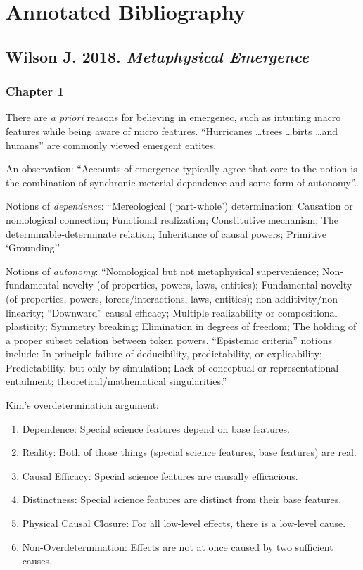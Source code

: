 \documentclass{article}
\newcommand{\ti}[1]{\textit{#1}}
\newcommand{\annbibtitle}[2]{\subsection*{#1. \ti{#2}}}
\begin{document}
\newpage
\section*{\centering Annotated Bibliography}
\bigskip \bigskip

\annbibtitle{Wilson J. 2018}{Metaphysical Emergence}
\subsubsection*{Chapter 1}

There are \ti{a priori} reasons for believing in emergenec, such as intuiting macro features while being aware of micro features. ``Hurricanes \dots trees \dots birts \dots and humans'' are commonly viewed emergent entites.

An observation: ``Accounts of emergence typically agree that core to the notion is the combination of synchronic meterial dependence and some form of autonomy''.

Notions of \ti{dependence}: ``Mereological (‘part-whole’) determination; Causation or nomological connection; Functional realization; Constitutive mechanism; The determinable-determinate relation; Inheritance of causal powers; Primitive `Grounding''

Notions of \ti{autonomy}: ``Nomological but not metaphysical supervenience; Non-fundamental novelty (of properties, powers, laws, entities); Fundamental novelty (of properties, powers, forces/interactions, laws, entities); non-additivity/non-linearity; ``Downward'' causal efficacy; Multiple realizability or compositional plasticity; Symmetry breaking; Elimination in degrees of freedom; The holding of a proper subset relation between token powers. “Epistemic criteria” notions include: In-principle failure of deducibility, predictability, or explicability; Predictability, but only by simulation; Lack of conceptual or representational entailment; theoretical/mathematical singularities.''

Kim's overdetermination argument:
\begin{enumerate}
    \item Dependence: Special science features depend on base features.
    \item Reality: Both of those things (special science features, base features) are real.
    \item Causal Efficacy: Special science features are causally efficacious.
    \item Distinctness: Special science features are distinct from their base features.
    \item Physical Causal Closure: For all low-level effects, there is a low-level cause.
    \item Non-Overdetermination: Effects are not at once caused by two sufficient causes.
\end{enumerate}
\end{document}
